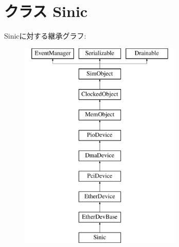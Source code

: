 \hypertarget{classEthernet_1_1Sinic}{
\section{クラス Sinic}
\label{classEthernet_1_1Sinic}
}
Sinicに対する継承グラフ:\begin{figure}[H]
\begin{center}
\leavevmode
\includegraphics[height=10cm]{classEthernet_1_1Sinic}
\end{center}
\end{figure}
